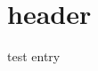 \documentclass{scrartcl}
\begin{document}
\section{header}\hypertarget{header}{}\label{header}

test entry
\end{document}
